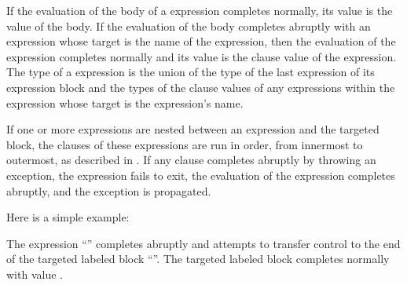 If the evaluation of the body of a  expression completes normally,
its value is the value of the body.
If the evaluation of the body completes abruptly
with an  expression whose target
is the name of the  expression,
then the evaluation of the  expression completes normally
and its value is the  clause value of the  expression.
The type of a  expression
is the union of the type of the last expression of its expression block
and the types of the  clause values of
any  expressions within the  expression
whose target is the  expression's name.

If one or more  expressions are nested between an
 expression and the targeted  block, the 
clauses of these expressions are run in order, from innermost to
outermost, as described in .  If any 
clause completes abruptly by throwing an exception, the 
expression fails to exit, the evaluation of the  expression
completes abruptly, and the exception is propagated.

Here is a simple example:

The expression ``'' completes
abruptly and attempts to transfer control to the end of the
targeted labeled block ``''.
The targeted labeled block completes normally with value .
